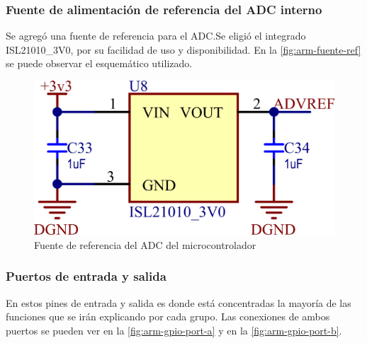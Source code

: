 \documentclass[../et.tex]{subfiles}
\begin{document}
\subsubsection{Fuente de alimentación de referencia del ADC interno}
Se agregó una fuente de referencia para el ADC.Se eligió el integrado ISL21010\_3V0, por su facilidad de uso y disponibilidad. En la \autoref{fig:arm-fuente-ref} se puede observar el esquemático utilizado.

\begin{figure}[!htbp]
  \centering
  \includegraphics[scale=1.5]{../images/arm-fuente-ref.png}
  \caption{Fuente de referencia del ADC del microcontrolador}
  \label{fig:arm-fuente-ref}
\end{figure}

\subsubsection{Puertos de entrada y salida}
En estos pines de entrada y salida es donde está concentradas la mayoría de las funciones que se irán explicando por cada grupo. Las conexiones de ambos puertos se pueden ver en la \autoref{fig:arm-gpio-port-a} y en la \autoref{fig:arm-gpio-port-b}.
\end{document}
